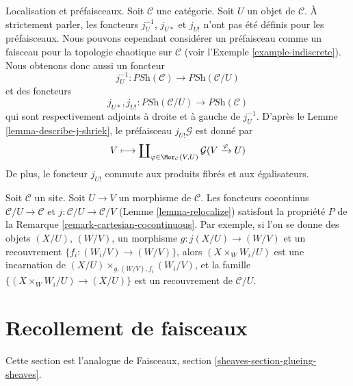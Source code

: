 \begin{remark}
\label{remark-localize-presheaves}
Localisation et préfaisceaux. Soit $\mathcal{C}$ une catégorie.
Soit $U$ un objet de $\mathcal{C}$. À strictement parler, les foncteurs
$j_U^{-1}$, $j_{U*}$ et $j_{U!}$ n’ont pas été définis pour les préfaisceaux.
Nous pouvons cependant considérer un préfaisceau comme un faisceau pour la
topologie chaotique sur $\mathcal{C}$ (voir l’Exemple
\ref{example-indiscrete}). Nous obtenons donc aussi un foncteur
$$
j_U^{-1} :
\textit{PSh}(\mathcal{C})
\longrightarrow
\textit{PSh}(\mathcal{C}/U)
$$
et des foncteurs
$$
j_{U*}, j_{U!} :
\textit{PSh}(\mathcal{C}/U)
\longrightarrow
\textit{PSh}(\mathcal{C})
$$
qui sont respectivement adjoints à droite et à gauche de $j_U^{-1}$.
D’après le Lemme \ref{lemma-describe-j-shriek}, le préfaisceau
$j_{U!}\mathcal{G}$ est donné par
$$
V \longmapsto
\coprod\nolimits_{\varphi \in \Mor_\mathcal{C}(V, U)}
\mathcal{G}(V \xrightarrow{\varphi} U)
$$
De plus, le foncteur $j_{U!}$ commute aux produits fibrés et aux égalisateurs.
\end{remark}

\begin{remark}
\label{remark-localization-cartesian-cocontinuous}
Soit $\mathcal{C}$ un site. Soit $U \to V$ un morphisme de $\mathcal{C}$.
Les foncteurs cocontinus $\mathcal{C}/U \to \mathcal{C}$ et
$j : \mathcal{C}/U \to \mathcal{C}/V$ (Lemme \ref{lemma-relocalize})
satisfont la propriété $P$ de la Remarque
\ref{remark-cartesian-cocontinuous}.
Par exemple, si l’on se donne des objets $(X/U)$, $(W/V)$, un morphisme
$g : j(X/U) \to (W/V)$ et un recouvrement
$\{f_i  : (W_i/V) \to (W/V)\}$, alors
$(X \times_W W_i/U)$ est une incarnation de
$(X/U) \times_{g, (W/V), f_i} (W_i/V)$, et la famille
$\{(X \times_W W_i/U) \to (X/U)\}$ est un recouvrement de $\mathcal{C}/U$.
\end{remark}



\section{Recollement de faisceaux}
\label{section-glueing-sheaves}

\noindent
Cette section est l’analogue de
Faisceaux, section \ref{sheaves-section-glueing-sheaves}.

